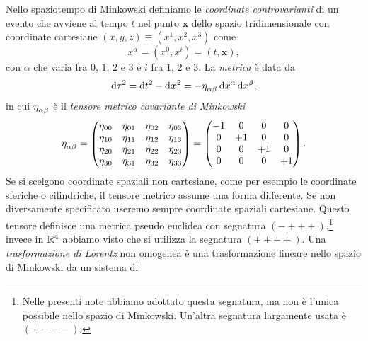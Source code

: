 Nello spaziotempo di Minkowski definiamo le
\emph{coordinate controvarianti} di un evento
che avviene al tempo $t$ nel punto $\bm{x}$ dello spazio tridimensionale con
coordinate cartesiane $(x,y,z) \equiv (x^{1}, x^{2}, x^{3})$ come
\begin{equation}
  \label{eq:coord-controvariante}
  x^{\alpha} = (x^{0},x^{i}) = (t, \bm{x}),
\end{equation}
con $\alpha$ che varia fra $0$, $1$, $2$ e $3$ e $i$ fra $1$, $2$ e $3$.  La
\emph{metrica} è data da
\begin{equation}
  \dd \tau^{2} = \dd t^{2} - \dd \bm{x}^{2} = -\tensor{\eta}{_{\alpha\beta}}\dd
  x^{\alpha} \dd x^{\beta},
\end{equation}
in cui $\tensor{\eta}{_{\alpha\beta}}$ è il
\emph{tensore metrico covariante di
  Minkowski}
\begin{equation}
  \label{eq:tensore-metrico-controvariante}
  \tensor{\eta}{_{\alpha\beta}} =
  \begin{pmatrix}
   \eta_{00} & \eta_{01} & \eta_{02} & \eta_{03} \\
   \eta_{10} & \eta_{11} & \eta_{12} & \eta_{13} \\
   \eta_{20} & \eta_{21} & \eta_{22} & \eta_{23} \\
   \eta_{30} & \eta_{31} & \eta_{32} & \eta_{33}
  \end{pmatrix}
  =
  \begin{pmatrix}
    -1 & 0  & 0  & 0 \\
    0  & +1 & 0  & 0 \\
    0  & 0  & +1 & 0 \\
    0  & 0  & 0  & +1
  \end{pmatrix}.
\end{equation}
Se si scelgono coordinate spaziali non cartesiane, come per esempio le
coordinate sferiche o cilindriche, il tensore metrico assume una forma
differente.  Se non diversamente specificato useremo sempre coordinate spaziali
cartesiane.  Questo tensore definisce una metrica pseudo euclidea con segnatura
$(-+++)$,\footnote{Nelle presenti note abbiamo adottato questa segnatura, ma non
  è l'unica possibile nello spazio di Minkowski.  Un'altra segnatura largamente
  usata è $(+---)$.}
invece in $\mathbb{R}^{4}$ abbiamo visto che si utilizza la segnatura $(++++)$.  Una
\emph{trasformazione di Lorentz} non omogenea è
una trasformazione lineare nello spazio di Minkowski da un sistema di
